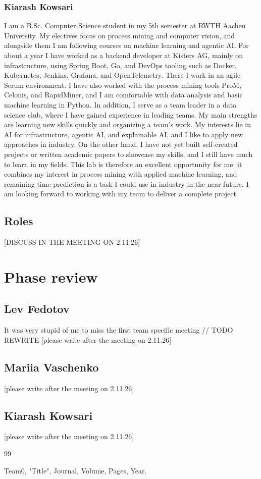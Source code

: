 \documentclass[12pt]{article}
\begin{document}
\subsubsection{Kiarash Kowsari}
I am a B.Sc. Computer Science student in my 5th semester at RWTH Aachen University. My electives focus on process mining and computer vision, and alongside them I am following courses on machine learning and agentic AI. For about a year I have worked as a backend developer at Kisters AG, mainly on infrastructure, using Spring Boot, Go, and DevOps tooling such as Docker, Kubernetes, Jenkins, Grafana, and OpenTelemetry. There I work in an agile Scrum environment. I have also worked with the process mining tools ProM, Celonis, and RapidMiner, and I am comfortable with data analysis and basic machine learning in Python. In addition, I serve as a team leader in a data science club, where I have gained experience in leading teams. My main strengths are learning new skills quickly and organizing a team's work. My interests lie in AI for infrastructure, agentic AI, and explainable AI, and I like to apply new approaches in industry. On the other hand, I have not yet built self-created projects or written academic papers to showcase my skills, and I still have much to learn in my fields. This lab is therefore an excellent opportunity for me: it combines my interest in process mining with applied machine learning, and remaining time prediction is a task I could use in industry in the near future. I am looking forward to working with my team to deliver a complete project.

\subsection{Roles}
[DISCUSS IN THE MEETING ON 2.11.26]
\section{Phase review}
\subsection{Lev Fedotov}
It was very stupid of me to miss the first team specific meeting // TODO REWRITE
[please write after   the meeting on 2.11.26]

\subsection{Mariia Vaschenko}
[please write after   the meeting on 2.11.26]

\subsection{Kiarash Kowsari}
[please write after  the meeting on 2.11.26]

\begin{thebibliography}{99}

 Team0, "Title",  Journal, Volume, Pages, Year. 

\end{thebibliography}
\end{document}

